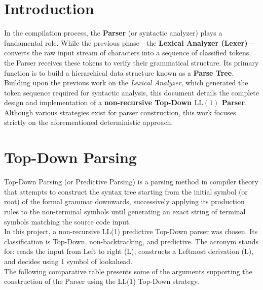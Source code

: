 \documentclass[12pt,letterpaper]{article}
\begin{document}
\newpage
{} %
\tableofcontents
\newpage


\section{Introduction}

In the compilation process, the \textbf{Parser} (or syntactic analyzer) plays a fundamental role. While the previous phase---the \textbf{Lexical Analyzer (Lexer)}---converts the raw input stream of characters into a sequence of classified tokens, the Parser receives these tokens to verify their grammatical structure. Its primary function is to build a hierarchical data structure known as a \textbf{Parse Tree}.\\

Building upon the previous work on the \textit{Lexical Analyzer}, which generated the token sequence required for syntactic analysis, this document details the complete design and implementation of a \textbf{non-recursive Top-Down $\text{LL}(1)$ Parser}. Although various strategies exist for parser construction, this work focuses strictly on the aforementioned deterministic approach.

\section{Top-Down Parsing}

Top-Down Parsing (or Predictive Parsing) is a parsing method in compiler theory that attempts to construct the syntax tree starting from the initial symbol (or root) of the formal grammar downwards, successively applying its production rules to the non-terminal symbols until generating an exact string of terminal symbols matching the source code input.\\

In this project, a non-recursive LL(1) predictive Top-Down parser was chosen. Its classification is Top-Down, non-backtracking, and predictive. The acronym stands for: reads the input from Left to right (L), constructs a Leftmost derivation (L), and decides using 1 symbol of lookahead.\\

The following comparative table presents some of the arguments supporting the construction of the Parser using the LL(1) Top-Down strategy.\\
\end{document}
